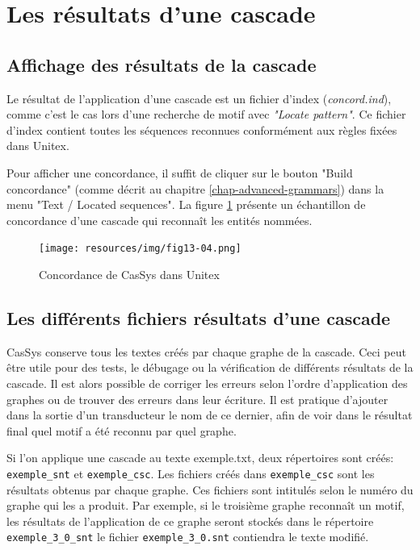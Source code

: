 \section{Les résultats d'une cascade}

\subsection{Affichage des résultats de la cascade}
\label{subsec:resultsCascade}

Le résultat de l'application d'une cascade est un fichier d'index (\textit{concord.ind}), comme c'est le cas
lors d'une recherche de motif avec \textit{"Locate pattern"}. Ce fichier d'index contient toutes les séquences
reconnues conformément aux règles fixées dans Unitex.

\bigskip
\noindent Pour afficher une concordance, il suffit de cliquer sur le bouton "Build concordance"
(comme décrit au chapitre \ref{chap-advanced-grammars}) dans la menu "Text / Located sequences".
La figure \ref{fig13-04} présente un échantillon de concordance d'une cascade qui reconnaît les entités
nommées.


\begin{figure}[!htb]
  \centering
  \texttt{[image: resources/img/fig13-04.png]}
  \caption{Concordance de CasSys dans Unitex}
  \label{fig13-04}
\end{figure}

\subsection{Les différents fichiers résultats d'une cascade}

CasSys conserve tous les textes créés par chaque graphe  de la cascade. Ceci peut être
utile  pour des tests, le débugage ou la vérification de différents résultats de la cascade. Il est
alors possible de corriger les erreurs selon l'ordre d'application des graphes ou de trouver des
erreurs dans leur écriture. Il est pratique d'ajouter dans la sortie d'un transducteur le nom de ce
dernier, afin de voir dans le résultat final quel motif a été reconnu par quel graphe.

Si l'on applique une cascade au texte exemple.txt, deux répertoires sont créés:
\verb+exemple_snt+ et \verb+exemple_csc+.
Les fichiers créés dans \verb+exemple_csc+ sont les résultats obtenus par
chaque graphe. Ces fichiers sont intitulés selon le numéro du graphe qui les a produit. Par exemple, si le
troisième graphe reconnaît un motif, les résultats de l'application de ce graphe seront stockés dans le 
répertoire  \verb+exemple_3+\newline\verb+_0_snt+ le fichier \verb+exemple_3_0.snt+ contiendra le texte modifié.

